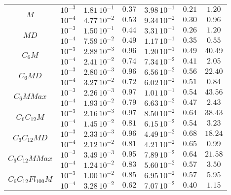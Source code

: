 \begin{tiny}
\begin{table}[H]
\begin{center}
\begin{tabular}{ |c|c|c|c|c|c|c| }
\hline
\multirow{2}{*}{$M$}
& $10^{-3}$ & $1.81\,10^{-1}$ & $0.37$ & $3.98\,10^{-1}$ & $0.21$ & $1.20$ \\ \cline{2-7}
& $10^{-4}$ & $4.77\,10^{-2}$ & $0.53$ & $9.34\,10^{-2}$ & $0.30$ & $0.96$ \\ \cline{2-7}
\hline\hline
\multirow{2}{*}{$MD$}
& $10^{-3}$ & $1.50\,10^{-1}$ & $0.44$ & $3.31\,10^{-1}$ & $0.26$ & $1.20$ \\ \cline{2-7}
& $10^{-4}$ & $7.59\,10^{-2}$ & $0.49$ & $1.17\,10^{-1}$ & $0.35$ & $0.55$ \\ \cline{2-7}
\hline\hline
\multirow{2}{*}{$C_6M$}
& $10^{-3}$ & $2.88\,10^{-3}$ & $0.96$ & $1.20\,10^{-1}$ & $0.49$ & $40.49$ \\ \cline{2-7}
& $10^{-4}$ & $2.41\,10^{-2}$ & $0.74$ & $7.34\,10^{-2}$ & $0.41$ & $2.05$ \\ \cline{2-7}
\hline\hline
\multirow{2}{*}{$C_6MD$}
& $10^{-3}$ & $2.80\,10^{-3}$ & $0.96$ & $6.56\,10^{-2}$ & $0.56$ & $22.40$ \\ \cline{2-7}
& $10^{-4}$ & $3.27\,10^{-2}$ & $0.72$ & $6.02\,10^{-2}$ & $0.51$ & $0.84$ \\ \cline{2-7}
\hline\hline
\multirow{2}{*}{$C_6MMax$}
& $10^{-3}$ & $2.26\,10^{-3}$ & $0.97$ & $1.01\,10^{-1}$ & $0.54$ & $43.56$ \\ \cline{2-7}
& $10^{-4}$ & $1.93\,10^{-2}$ & $0.79$ & $6.63\,10^{-2}$ & $0.47$ & $2.43$ \\ \cline{2-7}
\hline\hline
\multirow{2}{*}{$C_6C_{12}M$}
& $10^{-3}$ & $2.16\,10^{-3}$ & $0.97$ & $8.50\,10^{-2}$ & $0.64$ & $38.43$ \\ \cline{2-7}
& $10^{-4}$ & $1.45\,10^{-2}$ & $0.81$ & $6.15\,10^{-2}$ & $0.54$ & $3.23$ \\ \cline{2-7}
\hline\hline
\multirow{2}{*}{$C_6C_{12}MD$}
& $10^{-3}$ & $2.33\,10^{-3}$ & $0.96$ & $4.49\,10^{-2}$ & $0.68$ & $18.24$ \\ \cline{2-7}
& $10^{-4}$ & $2.12\,10^{-2}$ & $0.81$ & $4.21\,10^{-2}$ & $0.65$ & $0.99$ \\ \cline{2-7}
\hline\hline
\multirow{2}{*}{$C_6C_{12}MMax$}
& $10^{-3}$ & $3.49\,10^{-3}$ & $0.95$ & $7.89\,10^{-2}$ & $0.64$ & $21.58$ \\ \cline{2-7}
& $10^{-4}$ & $1.24\,10^{-2}$ & $0.83$ & $5.60\,10^{-2}$ & $0.57$ & $3.50$ \\ \cline{2-7}
			\hline\hline
\multirow{2}{*}{$C_6C_{12}Fl_{100}M$}
& $10^{-3}$ & $1.00\,10^{-2}$ & $0.85$ & $6.95\,10^{-2}$ & $0.57$ & $5.95$ \\ \cline{2-7}
& $10^{-4}$ & $3.28\,10^{-2}$ & $0.62$ & $7.07\,10^{-2}$ & $0.40$ & $1.15$ \\ \cline{2-7}

\end{tabular}
\end{center}
\end{table}
\end{tiny}
